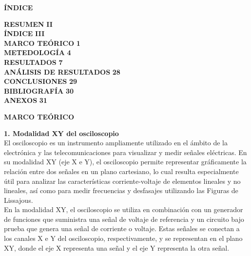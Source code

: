 \documentclass[12pt]{article}
\begin{document}
	\newpage
	
	\begin{center}
		\textbf{\large ÍNDICE}\\
	\end{center}
	
	\noindent \textbf{RESUMEN} \hfill \textbf{II}\\
	\noindent \textbf{ÍNDICE} \hfill \textbf{III}\\
	\noindent \textbf{MARCO TEÓRICO} \hfill \textbf{1}\\
	\noindent \textbf{METEDOLOGÍA} \hfill \textbf{4}\\
	\noindent \textbf{RESULTADOS} \hfill \textbf{7}\\
	\noindent \textbf{ANÁLISIS DE RESULTADOS} \hfill \textbf{28}\\
	\noindent \textbf{CONCLUSIONES} \hfill \textbf{29}\\
	\noindent \textbf{BIBLIOGRAFÍA} \hfill \textbf{30}\\
	\noindent \textbf{ANEXOS} \hfill \textbf{31}\\
	
	\newpage
	
	
	\begin{center}
		\textbf{\large MARCO TEÓRICO}\\
	\end{center}
	
	\textbf{1. Modalidad XY del osciloscopio}\\
	
	El osciloscopio es un instrumento ampliamente utilizado en el ámbito de la electrónica y las telecomunicaciones para visualizar y medir señales eléctricas. En su modalidad XY (eje X e Y), el osciloscopio permite representar gráficamente la relación entre dos señales en un plano cartesiano, lo cual resulta especialmente útil para analizar las características corriente-voltaje de elementos lineales y no lineales, así como para medir frecuencias y desfasajes utilizando las Figuras de Lissajous.\\
	
	En la modalidad XY, el osciloscopio se utiliza en combinación con un generador de funciones que suministra una señal de voltaje de referencia y un circuito bajo prueba que genera una señal de corriente o voltaje. Estas señales se conectan a los canales X e Y del osciloscopio, respectivamente, y se representan en el plano XY, donde el eje X representa una señal y el eje Y representa la otra señal.\\
	
\end{document}
